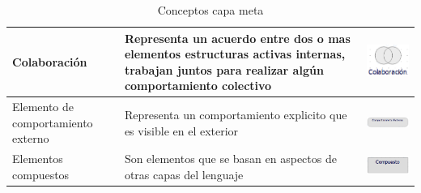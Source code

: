 \begin{table}[h!]
\begin{center}
\begin{tabular}{| m{6em} | m{7cm} | m{3cm} |}
		\hline
		Colaboración  
		& 
		Representa un acuerdo entre dos o mas elementos estructuras activas internas, trabajan juntos para realizar algún comportamiento colectivo   
		& \includegraphics[width=0.8\linewidth, height=0.05\textheight]{imgs/conceptos/meta/Colaboracion.PNG}
		\\
		
		\hline
		Elemento de comportamiento externo
		& 
		Representa un comportamiento explicito que es visible en el exterior  
		& \includegraphics[width=0.8\linewidth, height=0.05\textheight]{imgs/conceptos/meta/ComportamientoExterno.PNG}
		\\
		
		\hline
		
		Elementos compuestos 
		&
		Son elementos que se basan en aspectos de otras capas del lenguaje   
		&
		\includegraphics[width=0.8\linewidth, height=0.05\textheight]{imgs/conceptos/meta/Compuesto.PNG}
		\\
		
		\hline
	\end{tabular}
	\caption{Conceptos capa meta}
	\label{tab:concepts}
\end{center}
\end{table}